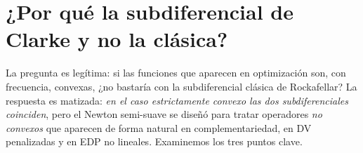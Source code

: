 \documentclass[12pt]{book}
\newcommand{\R}{\mathbb{R}}
\newcommand{\dom}{\operatorname{dom}}
\newcommand{\subdiff}{\partial}
\newcommand{\indic}{\delta}
\newcommand{\prox}{\operatorname{prox}}
\DeclareMathOperator*{\argmin}{arg\,min}
\newcommand{\Id}{\mathrm{Id}}
\DeclareMathOperator{\sign}{sgn}
\newcommand{\subdiffC}{\partial_C}
\newcommand{\subdiffL}{\partial_L}
\newcommand{\subdiffR}{\partial}
\theoremstyle{definition}
\theoremstyle{plain}
\theoremstyle{remark}
\begin{document}







\section{¿Por qué la subdiferencial de Clarke y no la clásica?}

La pregunta es legítima: si las funciones que aparecen en optimización
son, con frecuencia, convexas, ¿no bastaría con la subdiferencial
clásica de Rockafellar?  La respuesta es matizada: \emph{en el caso
estrictamente convexo las dos subdiferenciales coinciden}, pero el
Newton semi-suave se diseñó para tratar operadores \emph{no convexos}
que aparecen de forma natural en complementariedad, en DV
penalizadas y en EDP no lineales.  Examinemos los tres puntos clave.
\end{document}
